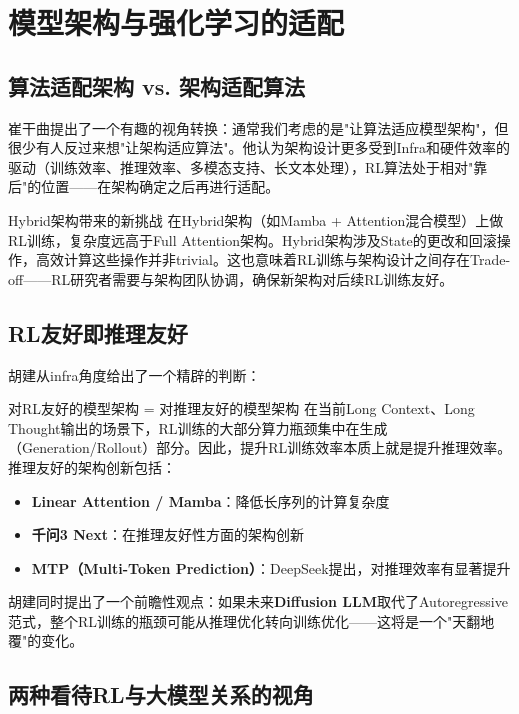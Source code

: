 \section{模型架构与强化学习的适配}

\subsection{算法适配架构 vs. 架构适配算法}

崔干曲提出了一个有趣的视角转换：通常我们考虑的是"让算法适应模型架构"，但很少有人反过来想"让架构适应算法"。他认为架构设计更多受到Infra和硬件效率的驱动（训练效率、推理效率、多模态支持、长文本处理），RL算法处于相对"靠后"的位置——在架构确定之后再进行适配。

\begin{warningbox}{Hybrid架构带来的新挑战}
在Hybrid架构（如Mamba + Attention混合模型）上做RL训练，复杂度远高于Full Attention架构。Hybrid架构涉及State的更改和回滚操作，高效计算这些操作并非trivial。这也意味着RL训练与架构设计之间存在Trade-off——RL研究者需要与架构团队协调，确保新架构对后续RL训练友好。
\end{warningbox}

\subsection{RL友好即推理友好}

胡建从infra角度给出了一个精辟的判断：

\begin{importantbox}{对RL友好的模型架构 = 对推理友好的模型架构}
在当前Long Context、Long Thought输出的场景下，RL训练的大部分算力瓶颈集中在生成（Generation/Rollout）部分。因此，提升RL训练效率本质上就是提升推理效率。推理友好的架构创新包括：
\begin{itemize}
    \item \textbf{Linear Attention / Mamba}：降低长序列的计算复杂度
    \item \textbf{千问3 Next}：在推理友好性方面的架构创新
    \item \textbf{MTP（Multi-Token Prediction）}：DeepSeek提出，对推理效率有显著提升
\end{itemize}
\end{importantbox}

胡建同时提出了一个前瞻性观点：如果未来\textbf{Diffusion LLM}取代了Autoregressive范式，整个RL训练的瓶颈可能从推理优化转向训练优化——这将是一个"天翻地覆"的变化。

\subsection{两种看待RL与大模型关系的视角}

